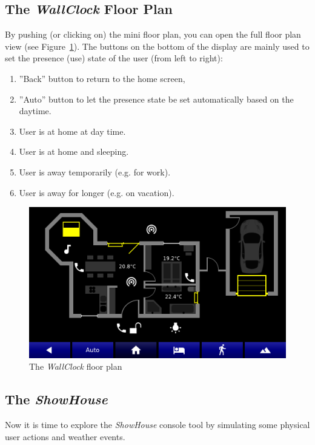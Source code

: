 \documentclass[12pt,english,parskip=half,headheight=19pt]{scrreprt}
\begin{document}
\subsection{The \textit{WallClock} Floor Plan}
\label{sec:tutorial-firststeps-floorplan}

By pushing (or clicking on) the mini floor plan, you can open the full floor plan view (see Figure~\ref{fig:tutorial-floorplan}). The buttons on the bottom of the display are mainly used to set the presence (use) state of the user (from left to right):

\begin{enumerate}
  \item ''Back'' button to return to the home screen,
  \item ''Auto'' button to let the presence state be set automatically based on the daytime.
  \item User is at home at day time.
  \item User is at home and sleeping.
  \item User is away temporarily (e.g. for work).
  \item User is away for longer (e.g. on vacation).
\end{enumerate}

\begin{figure}[ht]
  \centering
  \includegraphics[width=0.7\linewidth]{figs/wallclock-floorplan-3.png}
  \caption[l]{The \textit{WallClock} floor plan}
  \label{fig:tutorial-floorplan}
\end{figure}



\subsection{The \textit{ShowHouse}}
\label{sec:tutorial-firststeps-showhouse}

Now it is time to explore the \textit{ShowHouse} console tool by simulating some physical user actions and weather events.
\end{document}
